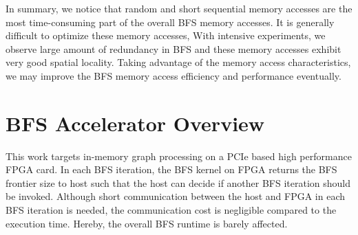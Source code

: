 %

In summary, we notice that random and short sequential memory accesses 
are the most time-consuming part of the overall BFS memory accesses. 
It is generally difficult to optimize these memory accesses, 
With intensive experiments, we observe large amount of redundancy in BFS and 
these memory accesses exhibit very good spatial locality. Taking advantage of the 
memory access characteristics, we may improve the BFS memory access efficiency 
and performance eventually.

\section{BFS Accelerator Overview} \label{sec:overview}
This work targets in-memory graph processing on a PCIe based 
high performance FPGA card. In each BFS iteration, 
the BFS kernel on FPGA returns the BFS frontier size to host such that the host can 
decide if another BFS iteration should be invoked. Although short communication 
between the host and FPGA in each BFS iteration is needed, the communication cost 
is negligible compared to the execution time. Hereby, 
the overall BFS runtime is barely affected.

